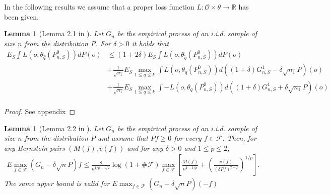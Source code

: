 \documentclass[11pt, a4paper]{article}
\newtheorem{lemma}[theorem]{Lemma}
\theoremstyle{definition}
\theoremstyle{remark}
\newcommand{\q}{q}
\newcommand{\btheta}{\theta}
\begin{document}
In the following results we assume that a proper loss function $ L: \mathcal{O} \times \btheta \to \mathbb{R} $ has been given.  
\begin{lemma}[Lemma 2.1 in \cite{vaart06}] \label{finitesampledecomp}
    Let $ G_{n} $ be the empirical process of an i.i.d. sample of size $ n $ from the distribution P. For $ \delta > 0 $ it holds that
   \begin{align*}
       E_{S} \int L(o, \btheta_{ \hat{\q}}(P_{n, S}^{0})) dP(o) &\leq (1 + 2 \delta) E_{S} \int L(o, \btheta_{ \tilde{\q} }(P_{n, S}^{0})) d P(o) \\ 
                                                                &+\frac{1}{\sqrt{n_1} } E_{S} \max_{1 \leq \q \leq k} \int L(o, \btheta_{\q}(P_{n, S}^{0})) d ((1 + \delta) G_{n,S}^{1} - \delta \sqrt{n_1} P)(o)  \\
                                                                &+\frac{1}{\sqrt{n_1} } E_{S} \max_{1 \leq \q \leq k} \int-L(o, \btheta_{\q}(P_{n, S}^{0})) d ((1 + \delta) G_{n,S}^{1} + \delta \sqrt{n_1} P)(o)  \\
   \end{align*}
\end{lemma}
\begin{proof}
    See appendix
\end{proof}

\begin{lemma}[Lemma 2.2 in \cite{vaart06}] \label{finitesamplebound}
    Let $G_{n}$ be the empirical process of an i.i.d. sample of size $n$ from the distribution $P$ and assume that $P f \geq 0$ for every $f \in \mathcal{F}$. Then, for any Bernstein pairs $(M(f), v(f))$ and for any $\delta>0$ and $1 \leq p \leq 2$,
    \begin{align*}
    E \max_{f \in \mathcal{F}}(G_n-\delta \sqrt{n} P) f \leq \frac{8}{n^{1 / p-1 / 2}} \log (1+\# \mathcal{F}) \max _{f \in \mathcal{F}}\left[\frac{M(f)}{n^{1-1 / p}}+\left(\frac{v(f)}{(\delta P f)^{2-p}}\right)^{1 / p}\right].
    \end{align*}
    The same upper bound is valid for $ E \max_{f \in \mathcal{F}}(G_n+\delta \sqrt{n} P)(-f) $  
\end{lemma}
\end{document}
